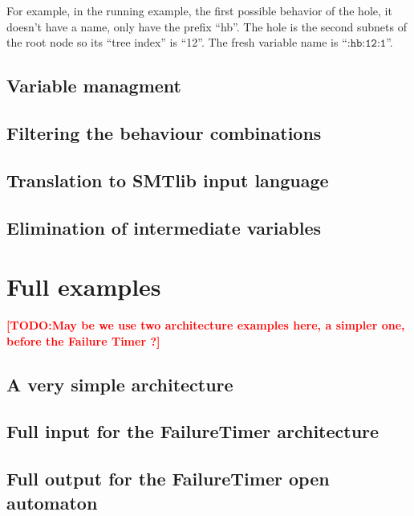\documentclass{lncs/llncs}
\newcommand{\TODO}[1]{\textcolor{red}{\textbf{[TODO:#1]}}}
\newcommand{\OTvar}{\texttt}
\begin{document}


For example, in the running example, the first possible behavior of
the hole, it doesn't have a name, only have the prefix ``hb''. The
hole is the second subnets of the root node so its ``tree index'' is
``12''. The fresh variable name is ``$\OTvar{:hb:12:1}$''. 
\subsection{Variable managment}
\subsection{Filtering the behaviour combinations}
\subsection{Translation to SMTlib input language}
\subsection{Elimination of intermediate variables}

\section{Full examples}
\TODO{May be we use two architecture examples here, a simpler one,
  before the Failure Timer ?}
\subsection{A very simple architecture}
\subsection{Full input for the FailureTimer architecture}
\subsection{Full output for the FailureTimer open automaton}
\end{document}
